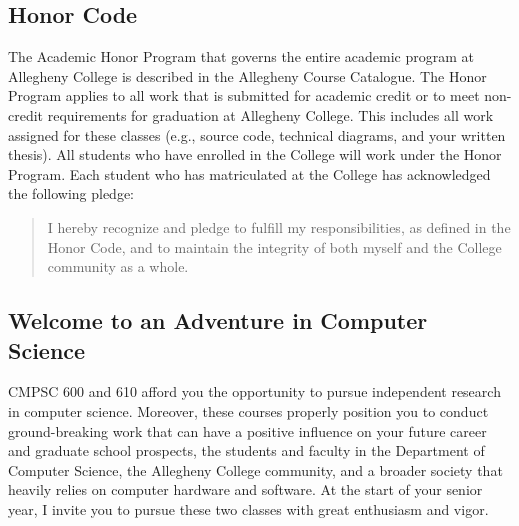 \subsection*{Honor Code}

The Academic Honor Program that governs the entire academic program at Allegheny College is described in the Allegheny
Course Catalogue.  The Honor Program applies to all work that is submitted for academic credit or to meet non-credit
requirements for graduation at Allegheny College.  This includes all work assigned for these classes (e.g., source code,
technical diagrams, and your written thesis).  All students who have enrolled in the College will work under the Honor
Program.  Each student who has matriculated at the College has acknowledged the following pledge:

\vspace*{-.1in}
\begin{quote}
I hereby recognize and pledge to fulfill my responsibilities, as defined in the Honor Code, and to maintain the
integrity of both myself and the College community as a whole.  
\end{quote}
\vspace*{-.15in}

\subsection*{Welcome to an Adventure in Computer Science}

CMPSC 600 and 610 afford you the opportunity to pursue independent research in computer science.  Moreover, these
courses properly position you to conduct ground-breaking work that can have a positive influence on your future career
and graduate school prospects, the students and faculty in the Department of Computer Science, the Allegheny College
community, and a broader society that heavily relies on computer hardware and software.  At the start of your senior
year, I invite you to pursue these two classes with great enthusiasm and vigor.

% 

